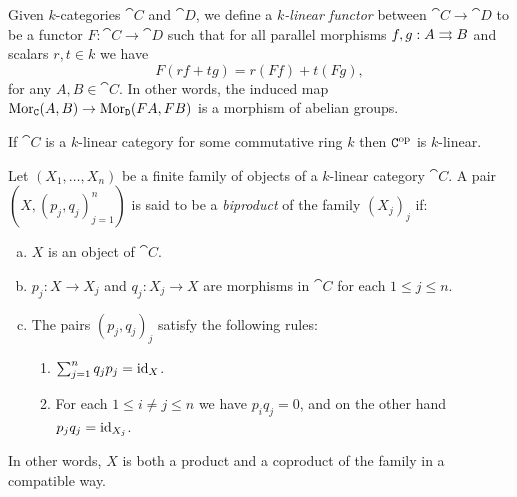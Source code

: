 \begin{definition}
    \label{def:k-linear-functor}
    Given \(k\)-categories \(\cat C\) and \(\cat D\), we define a
    \emph{\(k\)-linear functor} between \(\cat C \to \cat D\) to be a functor
    \(F: \cat C \to \cat D\) such that for all parallel morphisms
    \(f, g: A \rightrightarrows B\) and scalars \(r, t \in k\) we have
    \[
        F(r f + t g) = r (F f) + t (F g),
    \]
    for any \(A, B \in \cat C\). In other words, the induced map
    \(\operatorname{Mor}_{\texttt C}(A, B) \to \operatorname{Mor}_{\texttt D}(F A, F B)\) is a morphism of abelian
    groups.
\end{definition}

\begin{corollary}
    \label{cor:opposite-category-k-linear}
    If \(\cat C\) is a \(k\)-linear category for some commutative ring \(k\) then
    \(\texttt C^{\mathrm{op}}\) is \(k\)-linear.
\end{corollary}

\begin{definition}[Biproduct]
    \label{def:biproduct}
    Let \((X_1, \dots, X_n)\) be a finite family of objects of a \(k\)-linear
    category \(\cat C\). A pair \((X, (p_j, q_j)_{j=1}^n)\) is said to be a
    \emph{biproduct} of the family \((X_j)_j\) if:
    \begin{enumerate}[(a)]\setlength\itemsep{0em}
        \item \(X\) is an object of \(\cat C\).

        \item \(p_j: X \to X_j\) and \(q_j: X_j \to X\) are morphisms in \(\cat C\) for each
              \(1 \leq j \leq n\).

        \item The pairs \((p_j, q_j)_j\) satisfy the following rules:
              \begin{enumerate}[(1)]\setlength\itemsep{0em}
                  \item \(\sum_{j=1}^n q_j p_j = \operatorname{id}_X\).
                  \item For each \(1 \leq i \neq j \leq n\) we have \(p_i q_j = 0\), and on the other
                        hand \(p_j q_j = \operatorname{id}_{X_j}\).
              \end{enumerate}
    \end{enumerate}
    In other words, \(X\) is both a product and a coproduct of the family in a
    compatible way.
\end{definition}


